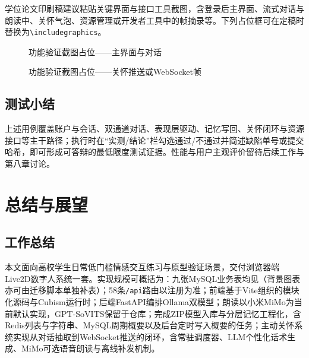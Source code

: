 \documentclass{base}
\begin{document}
学位论文印刷稿建议粘贴关键界面与接口工具截图，含登录后主界面、流式对话与朗读中、关怀气泡、资源管理或开发者工具中的帧摘录等。下列占位框可在定稿时替换为\texttt{\textbackslash includegraphics}。

\begin{figure}[htbp]
    \centering
    \caption{功能验证截图占位——主界面与对话}
    \label{fig:test_ui_main}
\end{figure}

\begin{figure}[htbp]
    \centering
    \caption{功能验证截图占位——关怀推送或WebSocket帧}
    \label{fig:test_remind_or_ws}
\end{figure}

\section{测试小结}

上述用例覆盖账户与会话、双通道对话、表现层驱动、记忆写回、关怀闭环与资源接口等主干路径；执行时在``实测/结论''栏勾选通过/不通过并简述缺陷单号或提交哈希，即可形成可答辩的最低限度测试证据。性能与用户主观评价留待后续工作与第八章讨论。

\chapter{总结与展望}

\section{工作总结}

本文面向高校学生日常低门槛情感交互练习与原型验证场景，交付浏览器端Live2D数字人系统一套。实现规模可概括为：九张MySQL业务表均见（背景图表亦可由迁移脚本单独补表）；58条\texttt{/api}路由以注册为准；前端基于Vite组织的模块化源码与Cubism运行时；后端FastAPI编排Ollama双模型；朗读以小米MiMo为当前默认实现，GPT-SoVITS保留于仓库；完成ZIP模型入库与分层记忆工程化，含Redis列表与字符串、MySQL周期概要以及后台定时写入概要的任务；主动关怀系统实现从对话抽取到WebSocket推送的闭环，含常驻调度器、LLM个性化话术生成、MiMo可选语音朗读与离线补发机制。
\end{document}
